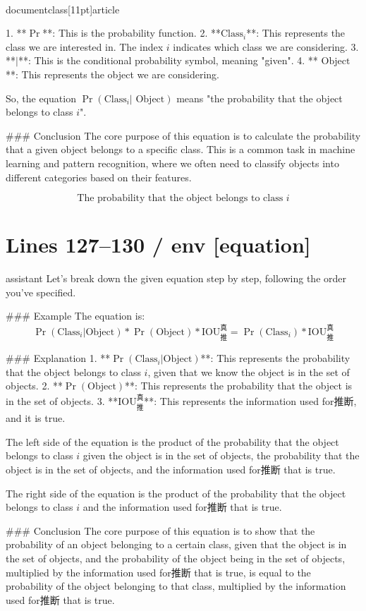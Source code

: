 \\documentclass[11pt]{article}
\begin{document}
1. **\(\Pr\)**: This is the probability function.
2. **\(\textrm{Class}_i\)**: This represents the class we are interested in. The index \(i\) indicates which class we are considering.
3. **\(|\)**: This is the conditional probability symbol, meaning "given".
4. **\(\textrm{ Object}\)**: This represents the object we are considering.

So, the equation \(\Pr(\textrm{Class}_i | \textrm{ Object})\) means "the probability that the object belongs to class \(i\)".

### Conclusion
The core purpose of this equation is to calculate the probability that a given object belongs to a specific class. This is a common task in machine learning and pattern recognition, where we often need to classify objects into different categories based on their features.

\[
\boxed{\text{The probability that the object belongs to class } i}
\]


\section*{Lines 127–130 / env [equation]}
assistant
Let's break down the given equation step by step, following the order you've specified.

### Example
The equation is:
\[
\Pr(\textrm{Class}_i | \textrm{Object}) * \Pr(\textrm{Object}) * \textrm{IOU}_{\textrm{推}}^{\textrm{真}} = \Pr(\textrm{Class}_i) * \textrm{IOU}_{\textrm{推}}^{\textrm{真}}
\]

### Explanation
1. **\(\Pr(\textrm{Class}_i | \textrm{Object})\)**: This represents the probability that the object belongs to class \(i\), given that we know the object is in the set of objects.
2. **\(\Pr(\textrm{Object})\)**: This represents the probability that the object is in the set of objects.
3. **\(\textrm{IOU}_{\textrm{推}}^{\textrm{真}}\)**: This represents the information used for推断, and it is true.

The left side of the equation is the product of the probability that the object belongs to class \(i\) given the object is in the set of objects, the probability that the object is in the set of objects, and the information used for推断 that is true.

The right side of the equation is the product of the probability that the object belongs to class \(i\) and the information used for推断 that is true.

### Conclusion
The core purpose of this equation is to show that the probability of an object belonging to a certain class, given that the object is in the set of objects, and the probability of the object being in the set of objects, multiplied by the information used for推断 that is true, is equal to the probability of the object belonging to that class, multiplied by the information used for推断 that is true.
\end{document}
